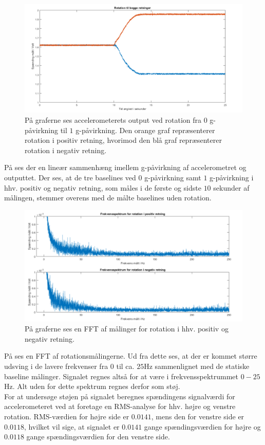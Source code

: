 \begin{figure}[H]
	\centering
	\includegraphics[scale=0.45]{figures/cProblemloesning/Pilotforsoeg_Rotation.png}
	\caption{På graferne ses accelerometerets output ved rotation fra $0$ g-påvirkning til $1$ g-påvirkning. Den orange graf repræsenterer rotation i positiv retning, hvorimod den blå graf repræsenterer rotation i negativ retning.}
	\label{Fig:Pilot_Rottid}
\end{figure}
\noindent På  ses der en lineær sammenhæng imellem g-påvirkning af accelerometret og outputtet. Der ses, at de tre baselines ved $0$ g-påvirkning samt $1$ g-påvirkning i hhv. positiv og negativ retning, som måles i de første og sidste $10$ sekunder af målingen, stemmer overens med de målte baselines uden rotation.
\begin{figure}[H]
	\centering
	\includegraphics[scale=0.5]{figures/cProblemloesning/Pilotforsoeg_RotationFrekvens.png}
	\caption{På graferne ses en FFT af målinger for rotation i hhv. positiv og negativ retning.}
	\label{Fig:Pilot_Rotfrek}
\end{figure}
\noindent På  ses en FFT af rotationsmålingerne. Ud fra dette ses, at der er kommet større udsving i de lavere frekvenser fra $0$ til ca. $25$Hz sammenlignet med de statiske baseline målinger. Signalet regnes altså for at være i frekvensspektrummet $0-25$Hz. Alt uden for dette spektrum regnes derfor som støj. \\
For at undersøge støjen på signalet beregnes spændingens signalværdi for accelerometeret ved at foretage en RMS-analyse for hhv. højre og venstre rotation. RMS-værdien for højre side er $0.0141$, mens den for venstre side er $0.0118$, hvilket vil sige, at signalet er $0.0141$ gange spændingsværdien for højre og $0.0118$ gange spændingsværdien for den venstre side.


